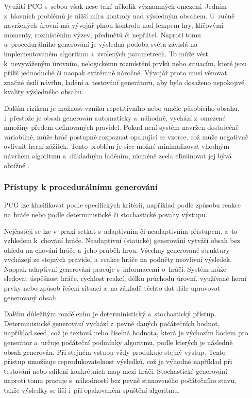 \documentclass[
   program=itk,
   biblatex,
   figures=true,
   tables=true,
   glossaries,
   index
]{kidiplom}
\begin{document}
Využití PCG s~sebou však nese také několik významných omezení. Jedním z~hlavních problémů je nižší míra kontroly nad výsledným obsahem. U~ručně navržených úrovní má vývojář plnou kontrolu nad tempem hry, klíčovými momenty, rozmístěním výzev, předmětů či nepřátel. Naproti tomu u~procedurálního generování je výsledná podoba světa závislá na implementovaném algoritmu a~zvolených parametrech. To může vést k~nevyváženým úrovním, nelogickému rozmístění prvků nebo situacím, které jsou příliš jednoduché či naopak extrémně náročné. Vývojář proto musí věnovat značné úsilí návrhu, ladění a~testování generátoru, aby bylo dosaženo uspokojivé kvality výsledného obsahu.

Dalším rizikem je možnost vzniku repetitivního nebo uměle působícího obsahu. I~přestože je obsah generován automaticky a~náhodně, vychází z~omezené množiny předem definovaných pravidel. Pokud není systém navržen dostatečně variabilně, může hráč postupně rozpoznat opakující se vzorce, což může negativně ovlivnit herní zážitek. Tento problém je sice možné minimalizovat vhodným návrhem algoritmu a~důkladným laděním, nicméně zcela eliminovat jej bývá obtížné \cite{Shaker2016}.

\subsubsection{Přístupy k procedurálnímu generování}
PCG lze klasifikovat podle specifických kritérií, například podle způsobu reakce na hráče nebo podle deterministické či stochastické povahy výstupu.

Nejčastěji se lze v~praxi setkat s~adaptivním či neadaptivním přístupem, a~to vzhledem k~chování hráče. Neadaptivní (statické) generování vytváří obsah bez ohledu na chování hráče a~jeho průběh hrou. Všechny generované struktury vycházejí ze stejných pravidel a~reakce hráče na podněty neovlivní výsledek. Naopak adaptivní generování pracuje s~informacemi o~hráči. Systém může sledovat úspěšnost hráče, rychlost reakcí, délku průchodu úrovní, využívané herní prvky nebo způsob řešení situací a~na základě těchto dat dále upravovat generovaný obsah.

Dalším důležitým rozdělením je deterministický a~stochastický přístup. Deterministické generování vychází z~pevně daných počátečních hodnot, například seed, což je textová nebo číselná hodnota, která je výchozím bodem pro generátor a~určuje počáteční podmínky algoritmu, podle kterých je následně obsah generován. Při stejném vstupu vždy produkuje stejný výstup. Tento přístup umožňuje reprodukovatelnost výsledků, což je výhodné například při testování nebo sdílení konkrétních map mezi hráči. Stochastické generování naproti tomu pracuje s~náhodností bez pevně stanoveného počátečního stavu, takže výsledky se liší i~při opakovaném spuštění algoritmu.
\end{document}
